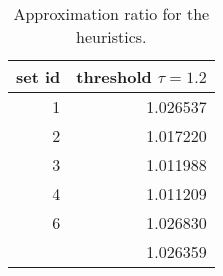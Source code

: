 

\begin{knitrout}
\color{fgcolor}\begin{table}

\caption{\label{tab:unnamed-chunk-2}Approximation ratio for the heuristics. \label{tab:objectives}}
\centering
\begin{tabular}[t]{rr}
\toprule
set id & threshold $\tau = 1.2$\\
\midrule
1 & 1.026537\\
2 & 1.017220\\
3 & 1.011988\\
4 & 1.011209\\
6 & 1.026830\\
\addlinespace
7 & 1.026359\\
\bottomrule
\end{tabular}
\end{table}

\end{knitrout}
